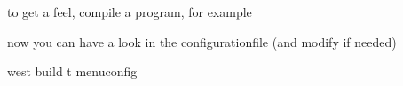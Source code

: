 \documentclass[letterpaper,10pt,english]{sphinxmanual}
\begin{document}
  to get a feel, compile a program, for example

\begin{sphinxVerbatim}[commandchars=\\\{\}]
\end{sphinxVerbatim}

now you can have a look in the configurationfile (and modify if needed)

\begin{sphinxVerbatim}[commandchars=\\\{\}]
 west build \PYGZhy{}t menuconfig
\end{sphinxVerbatim}
\end{document}
